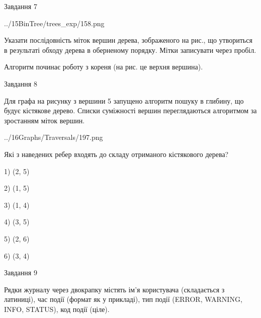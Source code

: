 \documentclass[12pt, ukrainian]{article}
\begin{document}
{\vspace{10mm}\par

\newpage
\begin{minipage}[t]{9.7cm}
               
{\begin{center}Завдання {7}\end{center}}
\vspace{-4mm}

\begin{center}
	{../15BinTree/trees_exp/158.png}
\end{center}
Указати послідовність міток вершин дерева, зображеного на рис., що утвориться в результаті обходу дерева в оберненому порядку. Мітки записувати через пробіл.\par Алгоритм починає роботу з кореня (на рис. це верхня вершина).\par

\end{minipage}
\vline \hspace{8mm}
\begin{minipage}[t]{8.0cm}
               
{\begin{center}Завдання {8}\end{center}}
\vspace{-4mm}
Для графа на рисунку з вершини 5 запущено алгоритм пошуку в глибину, що будує кістякове дерево. Списки суміжності вершин переглядаються алгоритмом за зростанням міток вершин.\par
\begin{center}
	{../16Graphs/Traversals/197.png}
\end{center}
\par Які з наведених ребер входять до складу отриманого кістякового дерева?\par
1) (2, 5)\par
2) (1, 5)\par
3) (1, 4)\par
4) (3, 5)\par
5) (2, 6)\par
6) (3, 4)\par
{\vskip 15pt} \par

\end{minipage}

               
{\begin{center}Завдання {9}\end{center}}
\vspace{-4mm}
Рядки журналу через двокрапку містять ім'я користувача (складається з латиниці), час події (фор\-мат як у прикладі), тип події (ERROR, WARNING, INFO, STATUS), код події (ціле).

}
\end{document}
